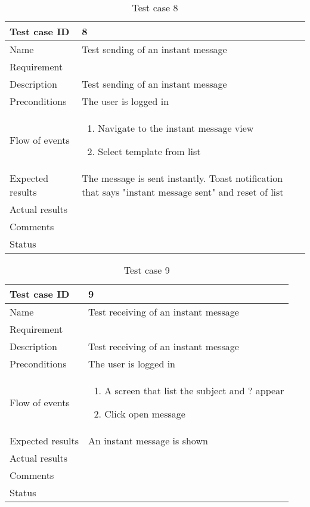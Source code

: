 \begin{table}
\begin{tabular}{l|p{10cm}}
Test case ID & 8 \\ \hline
Name & Test sending of an instant message\\ \hline
Requirement & \\ \hline
Description & Test sending of an instant message\\ \hline
Preconditions & The user is logged in\\ \hline
Flow of events & 
\begin{enumerate}
\item{}Navigate to the instant message view
\item{}Select template from list
\end{enumerate} \\ \hline
Expected results & The message is sent instantly. Toast notification that says "instant message sent" and reset of list\\ \hline \hline
Actual results & \\ \hline
Comments & \\ \hline
Status & 
\end{tabular}
\caption{Test case 8} \label{tab:case8}
\end{table}

\begin{table}
\begin{tabular}{l|p{10cm}}
Test case ID & 9 \\ \hline
Name & Test receiving of an instant message\\ \hline
Requirement & \\ \hline
Description & Test receiving of an instant message\\ \hline
Preconditions & The user is logged in\\ \hline
Flow of events & 
\begin{enumerate}
\item{}A screen that list the subject and ? appear
\item{}Click open message
\end{enumerate} \\ \hline
Expected results & An instant message is shown\\ \hline \hline
Actual results & \\ \hline
Comments & \\ \hline
Status & 
\end{tabular}
\caption{Test case 9} \label{tab:case9}
\end{table}

